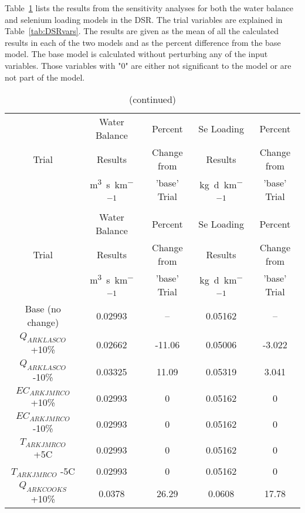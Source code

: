 \begin{linenumbers}
Table~\ref{tab:DSRSA} lists the results from the sensitivity analyses for both the water balance and selenium loading models in the DSR.  The trial variables are explained in Table~\ref{tab:DSRvars}.  The results are given as the mean of all the calculated results in each of the two models and as the percent difference from the base model.  The base model is calculated without perturbing any of the input variables.  Those variables with "0" are either not significant to the model or are not part of the model.

\begin{spacing}{1.0}
\begin{center}
\begin{longtable}{c|cc|cc}
    \caption[DSR Sensitivity Analysis Results]{DSR Sensitivity Analysis Results} \label{tab:DSRSA}\\ 
	\hline
    \multirow{3}[1]{*}{Trial} & Water Balance & Percent & Se Loading & Percent \\
          & Results & Change from & Results & Change from \\ 
          & \si{\cubic\meter\per\second\per\kilo\meter} & 'base' Trial & \si{\kilo\gram\per\day\per\kilo\meter} & 'base' Trial \\
    \hline
    \hline
    \endfirsthead
    \caption[]{(continued)}\\
    \hline
    \multirow{3}[1]{*}{Trial} & Water Balance & Percent & Se Loading & Percent \\
          & Results & Change from & Results & Change from \\ 
          & \si{\cubic\meter\per\second\per\kilo\meter} & 'base' Trial & \si{\kilo\gram\per\day\per\kilo\meter} & 'base' Trial \\
    \hline
    \hline
    \endhead
    Base (no change)&					0.02993&	--&	0.05162&	--\\               
	$Q_{ARKLASCO}$ +10\%&				0.02662&	-11.06&	0.05006&	-3.022\\      
	$Q_{ARKLASCO}$ -10\%&				0.03325&	11.09&	0.05319&	3.041\\       
	$EC_{ARKJMRCO}$ +10\%&				0.02993&	0&	0.05162&	0\\               
	$EC_{ARKJMRCO}$ -10\%&				0.02993&	0&	0.05162&	0\\               
	$T_{ARKJMRCO}$ +5C&					0.02993&	0&	0.05162&	0\\               
	$T_{ARKJMRCO}$ -5C&					0.02993&	0&	0.05162&	0\\               
	$Q_{ARKCOOKS}$ +10\%&				0.0378&	26.29&	0.0608&	17.78\\               

\end{longtable}
\end{center}
\end{spacing}
\end{linenumbers}
